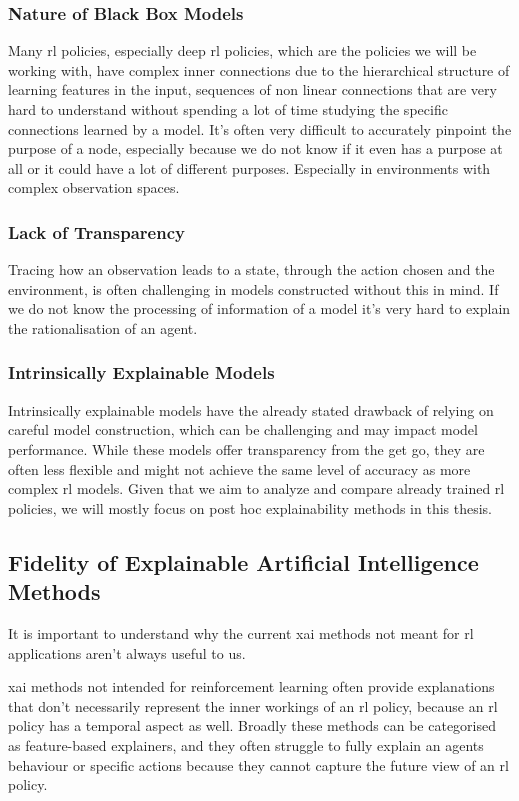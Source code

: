 \documentclass[UKenglish]{uiomasterthesis}
\begin{document}
\subsubsection{Nature of Black Box Models}
Many \ac{rl} policies, especially deep \ac{rl} policies, which are the policies we will be working with, have complex inner connections due to the hierarchical structure of learning features in the input, sequences of non linear connections that are very hard to understand without spending a lot of time studying the specific connections learned by a model. It's often very difficult to accurately pinpoint the purpose of a node, especially because we do not know if it even has a purpose at all or it could have a lot of different purposes. Especially in environments with complex observation spaces.


\subsubsection{Lack of Transparency}
Tracing how an observation leads to a state, through the action chosen and the environment, is often challenging in models constructed without this in mind. If we do not know the processing of information of a model it's very hard to explain the rationalisation of an agent.

\subsubsection{Intrinsically Explainable Models}
Intrinsically explainable models have the already stated drawback of relying on careful model construction, which can be challenging and may impact model performance. While these models offer transparency from the get go, they are often less flexible and might not achieve the same level of accuracy as more complex \ac{rl} models. Given that we aim to analyze and compare already trained \ac{rl} policies, we will mostly focus on post hoc explainability methods in this thesis.



\subsection{Fidelity of Explainable Artificial Intelligence Methods}
It is important to understand why the current \ac{xai} methods not meant for \ac{rl} applications aren't always useful to us.

\ac{xai} methods not intended for reinforcement learning often provide explanations that don't necessarily represent the inner workings of an \ac{rl} policy, because an \ac{rl} policy has a temporal aspect as well. Broadly these methods can be categorised as feature-based explainers, and they often struggle to fully explain an agents behaviour or specific actions because they cannot capture the future view of an \ac{rl} policy. 
\end{document}
